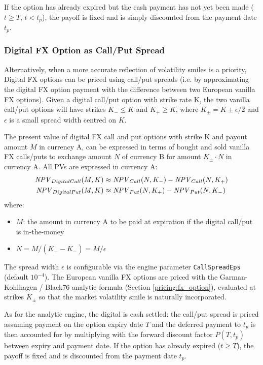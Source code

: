 If the option has already expired but the cash payment has not yet been made
($t \geq T$, $t < t_p$), the payoff is fixed and is simply discounted from the
payment date $t_p$.

\subsubsection*{Digital FX Option as Call/Put Spread}\label{pricing:fx_option_digital_callspread}

Alternatively, when a more accurate reflection of volatility smiles is a priority, 
Digital FX options can be priced using call/put spreads (i.e. by approximating 
the digital FX option payment with the difference between two European vanilla 
FX options). Given a digital call/put option with strike rate K, the two
vanilla call/put options will have strikes $K_- \leq K$ and $K_+\geq K$, where 
$K_\pm=K \pm \epsilon/2$ and $\epsilon$ is a small spread width centred on $K$.

The present value of digital FX call and put options with strike K and payout 
amount $M$ in currency A, can be expressed in terms of bought and sold vanilla 
FX calls/puts to exchange amount $N$ of currency B for amount $K_\pm \cdot N$ 
in currency A. All PVs are expressed in currency A:
\begin{align*}
\mathit{NPV}_{DigitalCall}(M,K) &\approx\mathit{NPV}_{Call}(N,K_-) - \mathit{NPV}_{Call}(N,K_+) \\
\mathit{NPV}_{DigitalPut}(M,K) &\approx\mathit{NPV}_{Put}(N,K_+) - \mathit{NPV}_{Put}(N,K_-) 
\end{align*}
where:
\begin{itemize}
\item $M$: the amount in currency A to be paid at expiration if the digital 
call/put is in-the-money
\item $N = M/(K_+ - K_-) = M/\epsilon$
\end{itemize}

The spread width $\epsilon$ is configurable via the engine parameter
\lstinline!CallSpreadEps! (default $10^{-4}$). The European vanilla FX options
are priced with the Garman-Kohlhagen / Black76 analytic formula (Section
\ref{pricing:fx_option}), evaluated at strikes $K_\pm$ so that the market
volatility smile is naturally incorporated.

As for the analytic engine, the digital is cash settled: the call/put spread is
priced assuming payment on the option expiry date $T$ and the deferred payment to
$t_p$ is then accounted for by multiplying with the forward discount factor
$P(T,t_p)$ between expiry and payment date. If the option has already expired
($t \geq T$), the payoff is fixed and is discounted from the payment date $t_p$.
